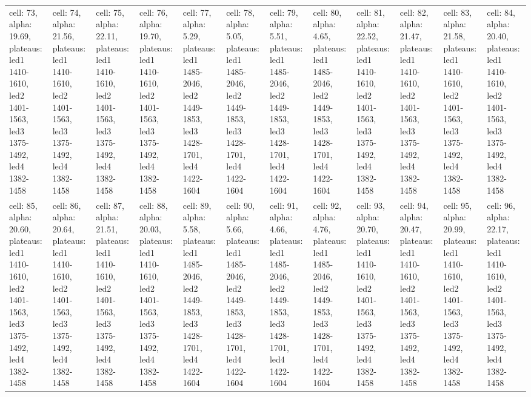 \documentclass{article}
\begin{document}
\begin{landscape}
\begin{longtable}{|p{1.5cm}|p{1.5cm}|p{1.5cm}|p{1.5cm}|p{1.5cm}|p{1.5cm}|p{1.5cm}|p{1.5cm}|p{1.5cm}|p{1.5cm}|p{1.5cm}|p{1.5cm}|}
\rowcolor{lightgray} cell: 73, alpha: 19.69, plateaus: led1 1410-1610, led2 1401-1563, led3 1375-1492, led4 1382-1458 &cell: 74, alpha: 21.56, plateaus: led1 1410-1610, led2 1401-1563, led3 1375-1492, led4 1382-1458 &cell: 75, alpha: 22.11, plateaus: led1 1410-1610, led2 1401-1563, led3 1375-1492, led4 1382-1458 &cell: 76, alpha: 19.70, plateaus: led1 1410-1610, led2 1401-1563, led3 1375-1492, led4 1382-1458 &cell: 77, alpha: 5.29, plateaus: led1 1485-2046, led2 1449-1853, led3 1428-1701, led4 1422-1604 &cell: 78, alpha: 5.05, plateaus: led1 1485-2046, led2 1449-1853, led3 1428-1701, led4 1422-1604 &cell: 79, alpha: 5.51, plateaus: led1 1485-2046, led2 1449-1853, led3 1428-1701, led4 1422-1604 &cell: 80, alpha: 4.65, plateaus: led1 1485-2046, led2 1449-1853, led3 1428-1701, led4 1422-1604 &cell: 81, alpha: 22.52, plateaus: led1 1410-1610, led2 1401-1563, led3 1375-1492, led4 1382-1458 &cell: 82, alpha: 21.47, plateaus: led1 1410-1610, led2 1401-1563, led3 1375-1492, led4 1382-1458 &cell: 83, alpha: 21.58, plateaus: led1 1410-1610, led2 1401-1563, led3 1375-1492, led4 1382-1458 &cell: 84, alpha: 20.40, plateaus: led1 1410-1610, led2 1401-1563, led3 1375-1492, led4 1382-1458 \\
cell: 85, alpha: 20.60, plateaus: led1 1410-1610, led2 1401-1563, led3 1375-1492, led4 1382-1458 &cell: 86, alpha: 20.64, plateaus: led1 1410-1610, led2 1401-1563, led3 1375-1492, led4 1382-1458 &cell: 87, alpha: 21.51, plateaus: led1 1410-1610, led2 1401-1563, led3 1375-1492, led4 1382-1458 &cell: 88, alpha: 20.03, plateaus: led1 1410-1610, led2 1401-1563, led3 1375-1492, led4 1382-1458 &cell: 89, alpha: 5.58, plateaus: led1 1485-2046, led2 1449-1853, led3 1428-1701, led4 1422-1604 &cell: 90, alpha: 5.66, plateaus: led1 1485-2046, led2 1449-1853, led3 1428-1701, led4 1422-1604 &cell: 91, alpha: 4.66, plateaus: led1 1485-2046, led2 1449-1853, led3 1428-1701, led4 1422-1604 &cell: 92, alpha: 4.76, plateaus: led1 1485-2046, led2 1449-1853, led3 1428-1701, led4 1422-1604 &cell: 93, alpha: 20.70, plateaus: led1 1410-1610, led2 1401-1563, led3 1375-1492, led4 1382-1458 &cell: 94, alpha: 20.47, plateaus: led1 1410-1610, led2 1401-1563, led3 1375-1492, led4 1382-1458 &cell: 95, alpha: 20.99, plateaus: led1 1410-1610, led2 1401-1563, led3 1375-1492, led4 1382-1458 &cell: 96, alpha: 22.17, plateaus: led1 1410-1610, led2 1401-1563, led3 1375-1492, led4 1382-1458 \\

\end{longtable}
\end{landscape}
\end{document}

